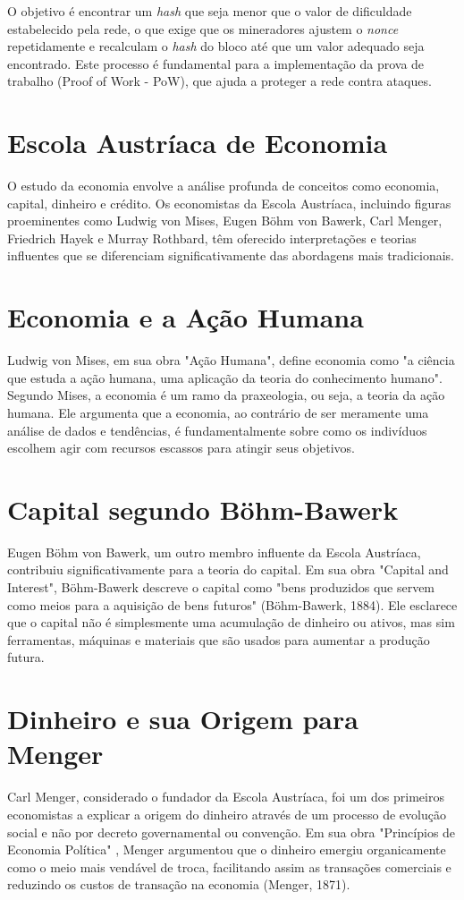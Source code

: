 O objetivo é encontrar um \textit{hash} que seja menor que o valor de dificuldade estabelecido pela rede, o que exige que os mineradores ajustem o \textit{nonce} repetidamente e recalculam o \textit{hash} do bloco até que um valor adequado seja encontrado. Este processo é fundamental para a implementação da prova de trabalho (Proof of Work - PoW), que ajuda a proteger a rede contra ataques.

\clearpage
\section{Escola Austríaca de Economia} \label{sec:austiaca}
O estudo da economia envolve a análise profunda de conceitos como economia, capital, dinheiro e crédito. Os economistas da Escola Austríaca, incluindo figuras proeminentes como Ludwig von Mises, Eugen Böhm von Bawerk, Carl Menger, Friedrich Hayek e Murray Rothbard, têm oferecido interpretações e teorias influentes que se diferenciam significativamente das abordagens mais tradicionais. 

\section*{Economia e a Ação Humana}
Ludwig von Mises, em sua obra "Ação Humana"\cite{von2023accao}, define economia como "a ciência que estuda a ação humana, uma aplicação da teoria do conhecimento humano". Segundo Mises, a economia é um ramo da praxeologia, ou seja, a teoria da ação humana. Ele argumenta que a economia, ao contrário de ser meramente uma análise de dados e tendências, é fundamentalmente sobre como os indivíduos escolhem agir com recursos escassos para atingir seus objetivos.

\section*{Capital segundo Böhm-Bawerk}
Eugen Böhm von Bawerk, um outro membro influente da Escola Austríaca, contribuiu significativamente para a teoria do capital. Em sua obra "Capital and Interest"\cite{von1922capital}, Böhm-Bawerk descreve o capital como "bens produzidos que servem como meios para a aquisição de bens futuros" (Böhm-Bawerk, 1884). Ele esclarece que o capital não é simplesmente uma acumulação de dinheiro ou ativos, mas sim ferramentas, máquinas e materiais que são usados para aumentar a produção futura.

\section*{Dinheiro e sua Origem para Menger}
Carl Menger, considerado o fundador da Escola Austríaca, foi um dos primeiros economistas a explicar a origem do dinheiro através de um processo de evolução social e não por decreto governamental ou convenção. Em sua obra "Princípios de Economia Política" \cite{menger2017liberalismo}, Menger argumentou que o dinheiro emergiu organicamente como o meio mais vendável de troca, facilitando assim as transações comerciais e reduzindo os custos de transação na economia (Menger, 1871).

